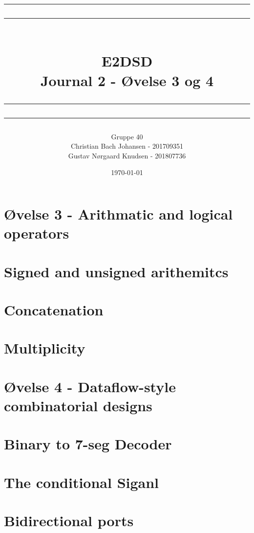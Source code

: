 \documentclass[12pt,a4paper]{article}
\newcommand\mymaketitle[1]{
   \rule{\textwidth}{1.6pt}\vspace*{-\baselineskip}\vspace*{2pt}
   \rule{\textwidth}{0.4pt}
   \\  
   \huge \bf #1\\
   \vspace{-8pt}
   \rule{\textwidth}{0.4pt}\vspace*{-\baselineskip}\vspace{3.2pt}
   \rule{\textwidth}{1.6pt}
}
\begin{document}
\title{
	\mymaketitle{E2DSD\\Journal 2 - Øvelse 3 og 4}
}
\author{
	Gruppe 40\\
	Christian Bach Johansen - 201709351\\
	Gustav Nørgaard Knudsen - 201807736
}
\date{\today}

\maketitle


\section*{Øvelse 3 - Arithmatic and logical operators}
\section{Signed and unsigned arithemitcs}

\newpage

\section{Concatenation}


\section{Multiplicity}


\section*{Øvelse 4 - Dataflow-style combinatorial designs}
\section{Binary to 7-seg Decoder}


\section{The conditional Siganl}


\section{Bidirectional ports}

\end{document}
